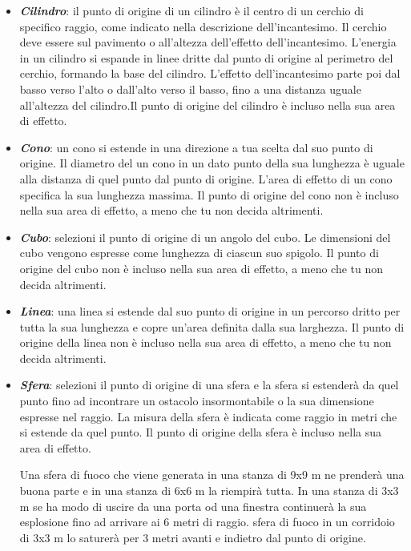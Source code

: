 \documentclass[12pt,a4paper,twoside,openany]{book}
\begin{document}
\begin{multicols}{2}
\begin{itemize}
\item
\textit{\textbf{Cilindro}}: il punto di origine di un cilindro è il centro di un cerchio di specifico raggio, come indicato nella descrizione dell'incantesimo. Il cerchio deve essere sul pavimento o all'altezza dell'effetto dell'incantesimo. L'energia in un cilindro si espande in linee dritte dal punto di origine al perimetro del cerchio, formando la base del cilindro. L'effetto dell'incantesimo parte poi dal basso verso l'alto o dall'alto verso il basso, fino a una distanza uguale all'altezza del cilindro.Il punto di origine del cilindro è incluso nella sua area di effetto.
	
\item
\textit{\textbf{Cono}}: un cono si estende in una direzione a tua scelta dal suo punto di origine. Il diametro del un cono in un dato punto della sua lunghezza è uguale alla distanza di quel punto dal punto di origine. L'area di effetto di un cono specifica la sua lunghezza massima. Il punto di origine del cono non è incluso nella sua area di effetto, a meno che tu non decida altrimenti.
	
\item
\textit{\textbf{Cubo}}: selezioni il punto di origine di un angolo del cubo. Le dimensioni del cubo vengono espresse come lunghezza di ciascun suo spigolo. Il punto di origine del cubo non è incluso nella sua area di effetto, a meno che tu non decida altrimenti.
	
\item
\textit{\textbf{Linea}}: una linea si estende dal suo punto di origine in un percorso dritto per tutta la sua lunghezza e copre un'area definita dalla sua larghezza. Il punto di origine della linea non è incluso nella sua area di effetto, a meno che tu non decida altrimenti.
	
\item
\textit{\textbf{Sfera}}: selezioni il punto di origine di una sfera e la sfera si estenderà da quel punto fino ad incontrare un ostacolo insormontabile o la sua dimensione espresse nel raggio. La misura della sfera è indicata come raggio in metri che si estende da quel punto. Il punto di origine della sfera è incluso nella sua area di effetto.
	
Una sfera di fuoco che viene generata in una stanza di 9x9 m ne prenderà una buona parte e in una stanza di 6x6 m la riempirà tutta. In una stanza di 3x3 m se ha modo di uscire da una porta od una finestra continuerà la sua esplosione fino ad arrivare ai 6 metri di raggio. sfera di fuoco in un corridoio di 3x3 m lo saturerà per 3 metri avanti e indietro dal punto di origine.
	

\end{itemize}
\end{multicols}
\end{document}
